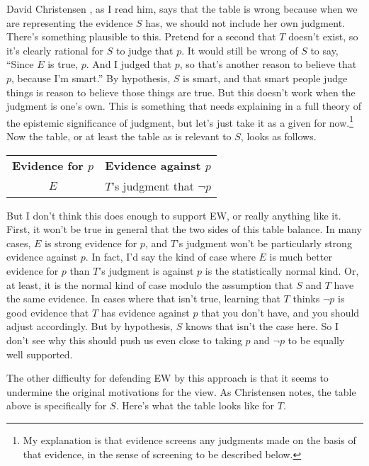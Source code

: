 David Christensen \citeyearpar{Christensen2010-CHRDQB}, as I read him, says that the table is wrong because when we are representing the evidence $S$ has, we should not include her own judgment. There's something plausible to this. Pretend for a second that $T$ doesn't exist, so it's clearly rational for $S$ to judge that $p$. It would still be wrong of $S$ to say, ``Since $E$ is true, $p$. And I judged that $p$, so that's another reason to believe that $p$, because I'm smart.'' By hypothesis, $S$ is smart, and that smart people judge things is reason to believe those things are true. But this doesn't work when the judgment is one's own. This is something that needs explaining in a full theory of the epistemic significance of judgment, but let's just take it as a given for now.\footnote{My explanation is that evidence screens any judgments made on the basis of that evidence, in the sense of screening to be described below.} Now the table, or at least the table as is relevant to $S$, looks as follows.

\begin{center}
\begin{tabular}{c c}
\textbf{Evidence for $p$} & \textbf{Evidence against $p$} \\
$E$ & $T$'s judgment that $\neg p$ \\
\end{tabular}
\end{center}

\noindent But I don't think this does enough to support EW, or really anything like it. First, it won't be true in general that the two sides of this table balance. In many cases, $E$ is strong evidence for $p$, and $T$'s judgment won't be particularly strong evidence against $p$. In fact, I'd say the kind of case where $E$ is much better evidence for $p$ than $T$'s judgment is against $p$ is the statistically normal kind. Or, at least, it is the normal kind of case modulo the assumption that $S$ and $T$ have the same evidence. In cases where that isn't true, learning that $T$ thinks $\neg p$ is good evidence that $T$ has evidence against $p$ that you don't have, and you should adjust accordingly. But by hypothesis, $S$ knows that isn't the case here. So I don't see why this should push us even close to taking $p$ and $\neg p$ to be equally well supported.

The other difficulty for defending EW by this approach is that it seems to undermine the original motivations for the view. As Christensen notes, the table above is specifically for $S$. Here's what the table looks like for $T$.

